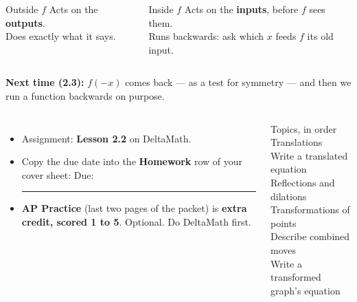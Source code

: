 \documentclass[aspectratio=169, 11pt]{beamer}
\begin{document}
\begin{frame}[t, plain]

  \begin{columns}[T]
      \begin{block}{Outside \(f\)}
        Acts on the \textbf{outputs}.\\[3pt]
        Does exactly what it says.
      \end{block}
      \begin{block}{Inside \(f\)}
        Acts on the \textbf{inputs}, before \(f\) sees them.\\[3pt]
        Runs backwards: ask which \(x\) feeds \(f\) its old input.
      \end{block}
  \end{columns}

  \bigskip
  \textbf{Next time (2.3):} \(f(-x)\) comes back --- as a test for symmetry --- and then we
  run a function backwards on purpose.
\end{frame}

\begin{frame}[t, plain]

  \begin{columns}[T]
      \begin{itemize}\setlength{\itemsep}{8pt}
        \item Assignment: \textbf{Lesson 2.2} on DeltaMath.
        \item Copy the due date into the \textbf{Homework} row of your cover sheet:
              \quad Due: \rule{3cm}{0.4pt}
        \item \textbf{AP Practice} (last two pages of the packet) is \textbf{extra credit, scored 1 to 5}.
              Optional. Do DeltaMath first.
      \end{itemize}

      \begin{block}{Topics, in order}
        Translations\\[2pt]
        Write a translated equation\\[2pt]
        Reflections and dilations\\[2pt]
        Transformations of points\\[2pt]
        Describe combined moves\\[2pt]
        Write a transformed graph's equation
      \end{block}
  \end{columns}
\end{frame}
\end{document}
